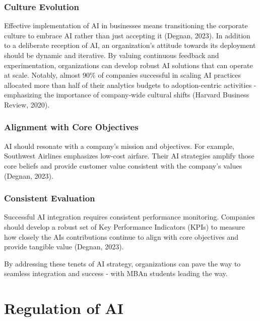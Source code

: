 \documentclass[
]{book}
\begin{document}
\hypertarget{culture-evolution}{%
\subsection{Culture Evolution}\label{culture-evolution}}

Effective implementation of AI in businesses means transitioning the corporate culture to embrace AI rather than just accepting it (Degnan, 2023). In addition to a deliberate reception of AI, an organization's attitude towards its deployment should be dynamic and iterative. By valuing continuous feedback and experimentation, organizations can develop robust AI solutions that can operate at scale. Notably, almost 90\% of companies successful in scaling AI practices allocated more than half of their analytics budgets to adoption-centric activities - emphasizing the importance of company-wide cultural shifts (Harvard Business Review, 2020).

\hypertarget{alignment-with-core-objectives}{%
\subsection{Alignment with Core Objectives}\label{alignment-with-core-objectives}}

AI should resonate with a company's mission and objectives. For example, Southwest Airlines emphasizes low-cost airfare. Their AI strategies amplify those core beliefs and provide customer value consistent with the company's values (Degnan, 2023).

\hypertarget{consistent-evaluation}{%
\subsection{Consistent Evaluation}\label{consistent-evaluation}}

Successful AI integration requires consistent performance monitoring. Companies should develop a robust set of Key Performance Indicators (KPIs) to measure how closely the AIs contributions continue to align with core objectives and provide tangible value (Degnan, 2023).

By addressing these tenets of AI strategy, organizations can pave the way to seamless integration and success - with MBAn students leading the way.

\hypertarget{regulation-of-ai}{%
\chapter{Regulation of AI}\label{regulation-of-ai}}
\end{document}
